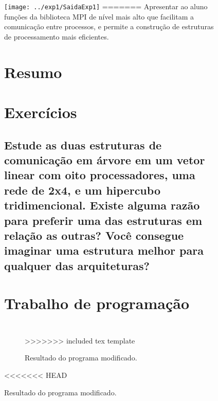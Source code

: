 \documentclass[11pt,a4paper,onecolumn]{article}
\begin{document}
\begin{figure}[h!]
  \centering
  \texttt{[image: ../exp1/SaidaExp1]}
=======
Apresentar ao aluno funções da biblioteca MPI de nível mais alto que facilitam a comunicação entre processos, e permite a construção de estruturas de processamento mais eficientes.

\section{Resumo}
\label{sec:resumo}


\section{Exercícios}
\subsection{Estude as duas estruturas de comunicação em árvore em um vetor linear com oito processadores, uma rede de 2x4, e um hipercubo tridimencional. Existe alguma razão para preferir uma das estruturas em relação as outras? Você consegue imaginar uma estrutura melhor para qualquer das arquiteturas?}

\section{Trabalho de programação}
\subsection{}

\begin{lstlisting}[style=cc]

\end{lstlisting}

\begin{figure}[h!]
  \centering
>>>>>>> included tex template
  \caption{Resultado do programa modificado.}
  \label{fig:exp}
\end{figure}

<<<<<<< HEAD

\end{figure}
\end{document}
